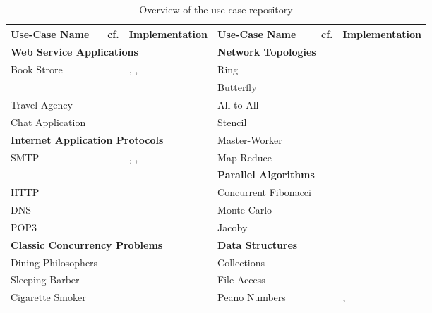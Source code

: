 \begin{table}[!h]
\begin{center}
\begin{tabular}{|l|l|l|l|l|l|}
	\hline
	Use-Case Name & cf. & Implementation
	&
	Use-Case Name & cf. & Implementation
	\\

	\hline
	\hline
	\multicolumn{3}{|l|}{ \textbf{Web Service Applications}}
	&
	\multicolumn{3}{|l|}{ \textbf{Network Topologies}}
	\\
	\hline
	Book Strore & \cite{W3C} & \SJ, \Mungo,
	&
	Ring & \cite{BerkleyPar} & \MPI	
	\\
	& & \JavaAPI
	&
	Butterfly & \cite{BerkleyPar} & \MPI
	\\
	Travel Agency & \cite{W3C} & \SJ
	&
	All to All & \cite{BerkleyPar} & \MPI	
	\\
	Chat Application & \cite{SF15} & \Erlang
	&
	Stencil & \cite{BerkleyPar} & \MPI
	\\

	\cline{1-3}
	\cline{1-3}
	\multicolumn{3}{|l|}{ \textbf{Internet Application Protocols}}
	&
	Master-Worker & \cite{BerkleyPar} & \MPI
	\\
	\cline{1-3}
	SMTP & \cite{RFC} & \Mungo, \Links,
	&
	Map Reduce & \cite{BerkleyPar} & \MPI
	\\
	\cline{4-6}
	\cline{4-6}
	&&\JavaAPI
	&
	\multicolumn{3}{|l|}{ \textbf{Parallel Algorithms}}
	\\
	\cline{4-6}
	HTTP & \cite{RFC} & \JavaAPI
	&
	Concurrent Fibonacci &  & \Mungo
	\\
	DNS & \cite{RFC} & \Erlang
	&
	Monte Carlo & \cite{citation_needed} & \MPI
	\\
	POP3 & \cite{RFC} & \Mungo
	&
	Jacoby & \cite{citation_needed} & \MPI
	\\

	\hline
	\multicolumn{3}{|l|}{ \textbf{Classic Concurrency Problems}}
	&
	\multicolumn{3}{|l|}{ \textbf{Data Structures}}
	\\
	\hline
	Dining Philosophers & \cite{Savina} & \SPython
	&
	Collections & \cite{mungo} & \Mungo
	\\
	Sleeping Barber & \cite{Savina} & \SPython
	&
	File Access & \cite{mungo} & \Mungo
	\\
	Cigarette Smoker & \cite{Savina} & \SPython
	&
	Peano Numbers & \cite{citation_needed} & \GV, \Links
	\\
	\hline
\end{tabular}
\end{center}
\caption{Overview of the use-case repository }
\label{table:use_cases_all}
\end{table}

